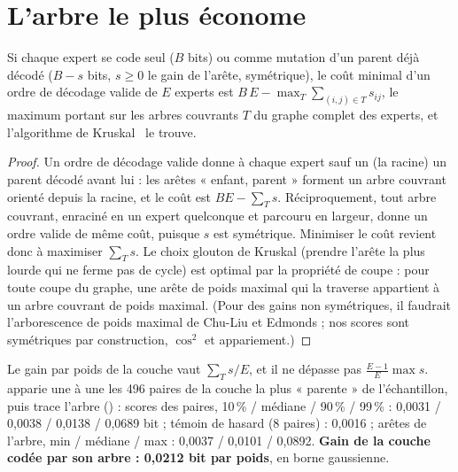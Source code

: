 \section{L'arbre le plus économe}\label{t3dup:sec:arbre}

\begin{proposition}\label{t3dup:prop:arbre}
Si chaque expert se code seul ($B$ bits) ou comme mutation d'un parent déjà décodé ($B - s$ bits, $s \ge 0$ le gain de l'arête, symétrique), le coût minimal d'un ordre de décodage valide de $E$ experts est $B\,E - \max_T \sum_{(i,j) \in T} s_{ij}$, le maximum portant sur les arbres couvrants $T$ du graphe complet des experts, et l'algorithme de Kruskal~\cite{kruskal1956} le trouve.
\end{proposition}

\begin{proof}
Un ordre de décodage valide donne à chaque expert sauf un (la racine) un parent décodé avant lui : les arêtes « enfant, parent » forment un arbre couvrant orienté depuis la racine, et le coût est $BE - \sum_T s$. Réciproquement, tout arbre couvrant, enraciné en un expert quelconque et parcouru en largeur, donne un ordre valide de même coût, puisque $s$ est symétrique. Minimiser le coût revient donc à maximiser $\sum_T s$. Le choix glouton de Kruskal (prendre l'arête la plus lourde qui ne ferme pas de cycle) est optimal par la propriété de coupe : pour toute coupe du graphe, une arête de poids maximal qui la traverse appartient à un arbre couvrant de poids maximal. (Pour des gains non symétriques, il faudrait l'arborescence de poids maximal de Chu-Liu et Edmonds ; nos scores sont symétriques par construction, $\cos^2$ et appariement.)
\end{proof}

Le gain par poids de la couche vaut $\sum_T s / E$, et il ne dépasse pas $\frac{E-1}{E}\max s$.  apparie une à une les 496 paires de la couche la plus « parente » de l'échantillon, puis trace l'arbre () \mes : scores des paires, 10\,\% / médiane / 90\,\% / 99\,\% : 0,0031 / 0,0038 / 0,0138 / 0,0689 bit ; témoin de hasard (8 paires) : 0,0016 ; arêtes de l'arbre, min / médiane / max : 0,0037 / 0,0101 / 0,0892. \textbf{Gain de la couche codée par son arbre : 0,0212 bit par poids}, en borne gaussienne.

\begin{figure}[tbp]
\centering
\GrapheDupArbre
{}
\label{fig:t3-dup-arbre}
\end{figure}

